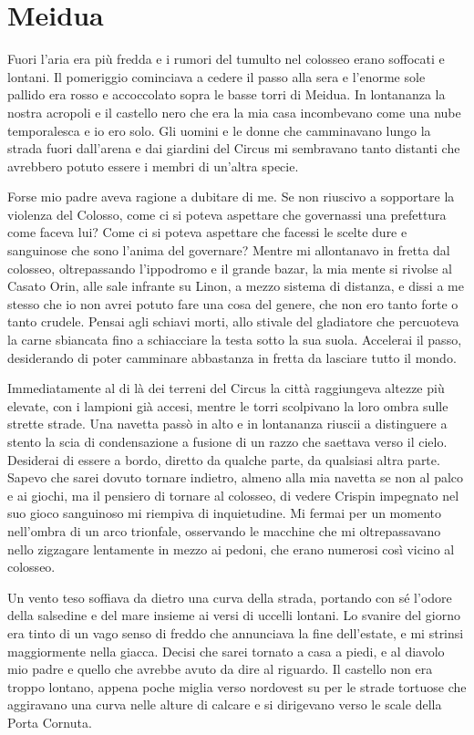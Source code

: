 \chapter{Meidua}

Fuori l'aria era più fredda e i rumori del tumulto nel colosseo erano
soffocati e lontani. Il pomeriggio cominciava a cedere il passo alla
sera e l'enorme sole pallido era rosso e accoccolato sopra le basse
torri di Meidua. In lontananza la nostra acropoli e il castello nero che
era la mia casa incombevano come una nube temporalesca e io ero solo.
Gli uomini e le donne che camminavano lungo la strada fuori dall'arena e
dai giardini del Circus mi sembravano tanto distanti che avrebbero
potuto essere i membri di un'altra specie.

Forse mio padre aveva ragione a dubitare di me. Se non riuscivo a
sopportare la violenza del Colosso, come ci si poteva aspettare che
governassi una prefettura come faceva lui? Come ci si poteva aspettare
che facessi le scelte dure e sanguinose che sono l'anima del governare?
Mentre mi allontanavo in fretta dal colosseo, oltrepassando l'ippodromo
e il grande bazar, la mia mente si rivolse al Casato Orin, alle sale
infrante su Linon, a mezzo sistema di distanza, e dissi a me stesso che
io non avrei potuto fare una cosa del genere, che non ero tanto forte o
tanto crudele. Pensai agli schiavi morti, allo stivale del gladiatore
che percuoteva la carne sbiancata fino a schiacciare la testa sotto la
sua suola. Accelerai il passo, desiderando di poter camminare abbastanza
in fretta da lasciare tutto il mondo.

Immediatamente al di là dei terreni del Circus la città raggiungeva
altezze più elevate, con i lampioni già accesi, mentre le torri
scolpivano la loro ombra sulle strette strade. Una navetta passò in alto
e in lontananza riuscii a distinguere a stento la scia di condensazione
a fusione di un razzo che saettava verso il cielo. Desiderai di essere a
bordo, diretto da qualche parte, da qualsiasi altra parte. Sapevo che
sarei dovuto tornare indietro, almeno alla mia navetta se non al palco e
ai giochi, ma il pensiero di tornare al colosseo, di vedere Crispin
impegnato nel suo gioco sanguinoso mi riempiva di inquietudine. Mi
fermai per un momento nell'ombra di un arco trionfale, osservando le
macchine che mi oltrepassavano nello zigzagare lentamente in mezzo ai
pedoni, che erano numerosi così vicino al colosseo.

Un vento teso soffiava da dietro una curva della strada, portando con sé
l'odore della salsedine e del mare insieme ai versi di uccelli lontani.
Lo svanire del giorno era tinto di un vago senso di freddo che
annunciava la fine dell'estate, e mi strinsi maggiormente nella giacca.
Decisi che sarei tornato a casa a piedi, e al diavolo mio padre e quello
che avrebbe avuto da dire al riguardo. Il castello non era troppo
lontano, appena poche miglia verso nordovest su per le strade tortuose
che aggiravano una curva nelle alture di calcare e si dirigevano verso
le scale della Porta Cornuta.

